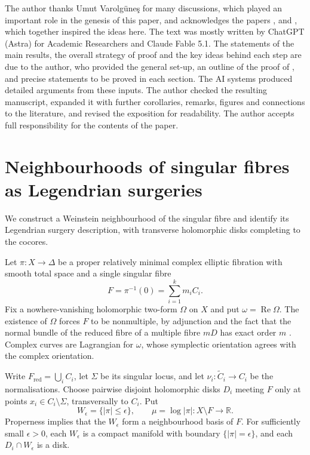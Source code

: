 \documentclass[a4paper]{amsart}
\newcommand{\R}{\mathbb{R}}
\DeclareMathOperator{\Ree}{Re}
\numberwithin{equation}{section}
\begin{document}
\begin{acknowledgements}
The author thanks Umut Varolg\"une\c{s} for many discussions, which
played an important role in the genesis of this paper, and acknowledges
the papers \cite{EOR}, \cite{KS} and \cite{Pascaleff}, which together
inspired the ideas here. The text was mostly written by ChatGPT (Astra)
for Academic Researchers and Claude Fable 5.1. The
statements of the main results, the overall strategy of proof and the
key ideas behind each step are due to the author, who provided the
general set-up, an outline of the proof of , and precise
statements to be proved in each section. The AI systems produced
detailed arguments from these inputs. The author checked the resulting
manuscript, expanded it with further corollaries, remarks, figures and
connections to the literature, and revised the exposition for
readability. The author accepts full responsibility for the contents of
the paper.
\end{acknowledgements}


\section{Neighbourhoods of singular fibres as Legendrian surgeries}
\label{sec:neighbourhoods}

We construct a Weinstein neighbourhood of the singular fibre and
identify its Legendrian surgery description, with transverse
holomorphic disks completing to the cocores.

Let $\pi:X\to\Delta$ be a proper relatively minimal complex elliptic
fibration with smooth total space and a single singular fibre
\[
 F=\pi^{-1}(0)=\sum_{i=1}^k m_iC_i.
\]
Fix a nowhere-vanishing holomorphic two-form $\Omega$ on $X$ and put
$\omega=\Ree\Omega$. The existence of $\Omega$ forces $F$ to be
nonmultiple, by adjunction and the fact that the normal bundle of
the reduced fibre of a multiple fibre $mD$ has exact order $m$
\cite[Section~15, Lemmas~1 and~3 and Corollary~4]{PetersSurfaces}.
Complex curves are Lagrangian for $\omega$, whose symplectic
orientation agrees with the complex orientation.

Write $F_{\mathrm{red}}=\bigcup_iC_i$, let $\Sigma$ be its singular
locus, and let $\nu_i:\widetilde C_i\to C_i$ be the normalisations.
Choose pairwise disjoint holomorphic disks $D_i$ meeting $F$ only at
points $x_i\in C_i\setminus\Sigma$, transversally to $C_i$. Put
\[
 W_\epsilon=\{|\pi|\le\epsilon\},
 \qquad
 \mu=\log|\pi|:X\setminus F\longrightarrow\R.
\]
Properness implies that the $W_\epsilon$ form a neighbourhood basis of
$F$. For sufficiently small $\epsilon>0$, each $W_\epsilon$ is a compact
manifold with boundary $\{|\pi|=\epsilon\}$, and each
$D_i\cap W_\epsilon$ is a disk.
\end{document}
